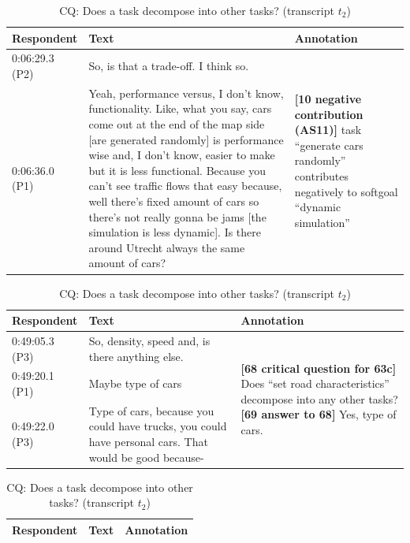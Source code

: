 \documentclass[11.5pt,two column]{llncs}
\begin{document}
\begin{table}[!htbp]
\begin{tabular}{|p{20mm}|p{100mm}|p{30mm}|}
\hline
Respondent & Text & Annotation\\
\hline
0:06:29.3 (P2) & So, is that a trade-off. I think so. &\multirow{2}{30mm}{\textbf{[10 negative contribution (AS11)]}  task ``generate cars randomly'' contributes negatively to softgoal ``dynamic simulation''}\\	
\cline{1-2}
0:06:36.0 (P1) & Yeah, performance versus, I don't know, functionality. Like, what you say, cars come out at the end of the map side [are generated randomly] is performance wise and, I don't know, easier to make but it is less functional. Because you can't see traffic flows that easy because, well there's fixed amount of cars so there's not really gonna be jams [the simulation is less dynamic]. Is there around Utrecht always the same amount of cars? &\\
\hline	
\end{tabular}
\caption{AS11: Negative decomposition (transcript $t_1$)}
\label{table:transcript:as11}

\begin{tabular}{|p{20mm}|p{80mm}|p{50mm}|}
\hline
Respondent & Text & Annotation\\
\hline
0:49:05.3 (P3)&So, density, speed and, is there anything else.&\multirow{3}{50mm}{\textbf{[68 critical question for 63c]} Does ``set road characteristics'' decompose into any other tasks?\newline
\textbf{[69 answer to 68]} Yes, type of cars.}\\
\cline{1-2}
0:49:20.1 (P1) & Maybe type of cars&\\	
\cline{1-2}
0:49:22.0 (P3) & Type of cars, because you could have trucks, you could have personal cars. That would be good because-&\\
\hline	
\end{tabular}
\caption{CQ: Does a task decompose into other tasks? (transcript $t_2$)}
\label{table:transcript:cq:task_decomp}

\begin{tabular}{|p{20mm}|p{60mm}|p{70mm}|}
\hline
Respondent & Text & Annotation\\
\hline


\end{tabular}
\end{table}
\end{document}
